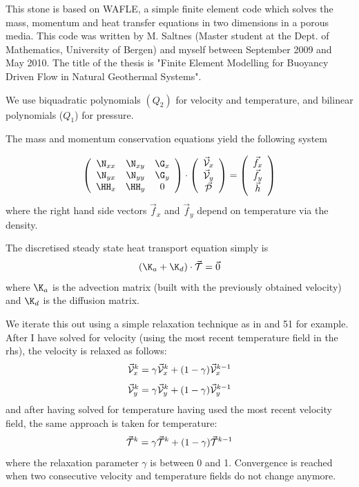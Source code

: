 
This stone is based on WAFLE, a simple finite element code which solves the mass, momentum and heat transfer equations in two dimensions in a porous media. This  code was written by M. Saltnes (Master student at the Dept. of Mathematics, University of Bergen) and myself between September 2009 and May 2010. The title of the thesis is "Finite Element Modelling for Buoyancy Driven Flow in Natural Geothermal Systems". 








We use biquadratic polynomials $(Q_2)$ for velocity and temperature, 
and bilinear polynomials ($Q_1$) for pressure.

The mass and momentum conservation equations yield the following system 

\[
\left(
\begin{array}{ccc}
\N_{xx} & \N_{xy} & \G_x \\
\N_{yx} & \N_{yy} & \G_y \\
\HH_{x} & \HH_y & 0 
\end{array}
\right)
\cdot
\left(
\begin{array}{c}
\vec{\cal V}_x \\
\vec{\cal V}_y \\ 
\vec{\cal P}
\end{array}
\right)
=
\left(
\begin{array}{c}
\vec{f}_x \\ 
\vec{f}_y \\ 
\vec{h}
\end{array}
\right)
\]
where the right hand side vectors $\vec{f}_x $ and $\vec{f}_y$ depend on temperature via the density. 

The discretised steady state heat transport equation simply is 
\[
({\K}_a + {\K}_d ) \cdot \vec{\cal T}= \vec{0}
\]
where $\K_a$ is the advection matrix (built with the previously obtained velocity) and $\K_d$ is the diffusion matrix.

We iterate this out using a simple relaxation technique \cite{vyrc13} as in  and 51 for example.
After I have solved for velocity (using the most recent temperature field in the rhs), the velocity is relaxed as follows:
\[
\vec{\cal V}_x^k = \gamma \vec{\cal V}_x^k + (1-\gamma) \vec{\cal V}_x^{k-1}
\]
\[
\vec{\cal V}_y^k = \gamma \vec{\cal V}_y^k + (1-\gamma) \vec{\cal V}_y^{k-1}
\]
and after having solved for temperature having used the most recent velocity field, the same approach is taken for temperature:
\[
\vec{\cal T}^k = \gamma \vec{\cal T}^k + (1-\gamma) \vec{\cal T}^{k-1}
\]
where the relaxation parameter $\gamma$ is between 0 and 1.
Convergence is reached when two consecutive velocity and temperature fields
do not change anymore.

